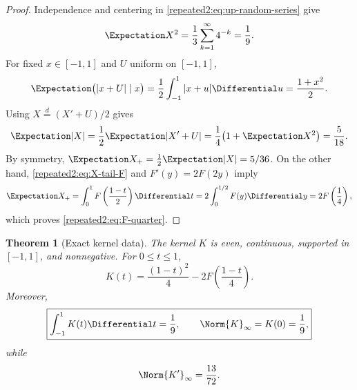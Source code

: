 \documentclass[11pt,oneside]{article}
\newtheorem{theorem}{Theorem}[section]
\theoremstyle{definition}
\theoremstyle{remark}
\begin{document}
\begin{proof}
Independence and centering in \eqref{repeated2:eq:up-random-series} give
\[
 \Expectation X^2=\frac13\sum_{k=1}^{\infty}4^{-k}=\frac19.
\]
For fixed $x\in[-1,1]$ and $U$ uniform on $[-1,1]$,
\[
 \Expectation\bigl(|x+U|\mid x\bigr)=\frac12\int_{-1}^{1}|x+u|\Differential u
 =\frac{1+x^2}{2}.
\]
Using $X\stackrel d=(X'+U)/2$ gives
\[
 \Expectation|X|=\frac12\Expectation|X'+U|
 =\frac14\bigl(1+\Expectation X^2\bigr)=\frac5{18}.
\]
By symmetry, $\Expectation X_+=\frac12\Expectation|X|=5/36$.  On the other hand,
\eqref{repeated2:eq:X-tail-F} and $F'(y)=2F(2y)$ imply
\[
 \Expectation X_+=\int_0^1F\left(\frac{1-t}{2}\right)\Differential t
 =2\int_0^{1/2}F(y)\Differential y=2F\left(\frac14\right),
\]
which proves \eqref{repeated2:eq:F-quarter}.
\end{proof}

\begin{theorem}[Exact kernel data]
\label{repeated2:thm:kernel-data}
The kernel $K$ is even, continuous, supported in $[-1,1]$, and nonnegative.  For
$0\le t\le1$,
\begin{equation}
 K(t)=\frac{(1-t)^2}{4}-2F\left(\frac{1-t}{4}\right).
 \label{repeated2:eq:K-explicit}
\end{equation}
Moreover,
\begin{equation}
 \boxed{\displaystyle
 \int_{-1}^{1}K(t)\Differential t=\frac19,
 \qquad
 \Norm{K}_\infty=K(0)=\frac19,}
 \label{repeated2:eq:K-mass-and-max}
\end{equation}
while
\begin{equation}
 \Norm{K'}_\infty=\frac{13}{72}.
 \label{repeated2:eq:Kprime-max}
\end{equation}
\end{theorem}
\end{document}
